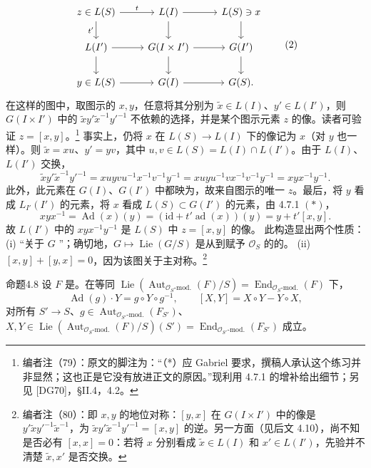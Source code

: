 \[\begin{tikzcd}
z\in L(S)\arrow[r,"t"]\arrow[d,"t'"']&L(I)\arrow[r]\arrow[d]&L(S)\ni x\arrow[d]\\
L(I')\arrow[r]\arrow[d]&G(I\times I')\arrow[r]\arrow[d]&G(I')\arrow[d]\\
y\in L(S)\arrow[r]&G(I)\arrow[r]&G(S).
\end{tikzcd}\tag{2}\]
在这样的图中，取图示的 $x,y$，任意将其分别为 $\widetilde x\in L(I)$、$y'\in L(I')$，则 $G(I\times I')$ 中的 $\widetilde xy'\widetilde x^{-1}y'^{-1}$ 不依赖的选择，并是某个图示元素 $z$ 的像。读者可验证 $z=[x,y]$。\footnote{编者注（79）：原文的脚注为：“（*）应 Gabriel 要求，撰稿人承认这个练习并非显然；这也正是它没有放进正文的原因。”现利用 4.7.1 的增补给出细节；另见 [DG70]，\S II.4，4.2。}
事实上，仍将 $x$ 在 $L(S)\to L(I)$ 下的像记为 $x$（对 $y$ 也一样）。则 $\widetilde x=xu$、$y'=yv$，其中 $u,v\in L(S)=L(I)\cap L(I')$。由于 $L(I)$、$L(I')$ 交换，
\[\widetilde xy'\widetilde x^{-1}y'^{-1}=xuyvu^{-1}x^{-1}v^{-1}y^{-1}=xuyu^{-1}vx^{-1}v^{-1}y^{-1}=xyx^{-1}y^{-1}.\]
此外，此元素在 $G(I)$、$G(I')$ 中都映为，故来自图示的唯一 $z$。最后，将 $y$ 看成 $L_{I'}(I')$ 的元素，将 $x$ 看成 $L(S)\subset G(I')$ 的元素，由 4.7.1 $(*)$，
\[xyx^{-1}=\operatorname{Ad}(x)(y)=(\mathrm{id}+t'\operatorname{ad}(x))(y)=y+t'[x,y].\]
故 $L(I')$ 中的 $xyx^{-1}y^{-1}$ 是 $L(S)$ 中 $z=[x,y]$ 的像。
此构造显出两个性质：
(i) “关于 $G$ ”；确切地，$G\mapsto\operatorname{Lie}(G/S)$ 是从到赋予 $\mathcal O_S$ 的的。
(ii) $[x,y]+[y,x]=0$，因为该图关于主对称。\footnote{编者注（80）：即 $x,y$ 的地位对称：$[y,x]$ 在 $G(I\times I')$ 中的像是 $y'\widetilde xy'^{-1}\widetilde x^{-1}$，为 $\widetilde xy'\widetilde x^{-1}y'^{-1}=[x,y]$ 的逆。另一方面（见后文 4.10），尚不知是否必有 $[x,x]=0$：若将 $x$ 分别看成 $\widetilde x\in L(I)$ 和 $x'\in L(I')$，先验并不清楚 $\widetilde x,x'$ 是否交换。}
\begin{SGAresult}{命题}{4.8}
设 $F$ 是。在等同
$\operatorname{Lie}(\operatorname{Aut}_{\mathcal O_S\text{-mod.}}(F)/S)=\operatorname{End}_{\mathcal O_S\text{-mod.}}(F)$ 下，
\[\operatorname{Ad}(g)\cdot Y=g\circ Y\circ g^{-1},\qquad[X,Y]=X\circ Y-Y\circ X,\]
对所有 $S'\to S$、$g\in\operatorname{Aut}_{\mathcal O_{S'}\text{-mod.}}(F_{S'})$、$X,Y\in\operatorname{Lie}(\operatorname{Aut}_{\mathcal O_S\text{-mod.}}(F)/S)(S')=\operatorname{End}_{\mathcal O_{S'}\text{-mod.}}(F_{S'})$ 成立。
\end{SGAresult}
